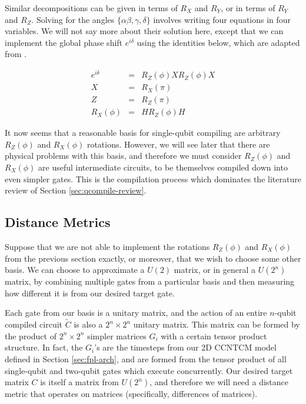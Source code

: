 Similar decompositions can be given in terms of $R_X$ and $R_Y$, or in
terms of $R_Y$ and $R_Z$. Solving for the angles $\{ \alpha \beta, \gamma, \delta \}$
involves writing four equations in four variables. We will not say
more about their solution here, except that we can implement the
global phase shift $e^{i\delta}$ using the identities below, which are
adapted from \cite{Kitaev2002}.

\begin{eqnarray}
e^{i\delta} & = & R_Z(\phi)X R_Z(\phi) X \\
X & = & R_X(\pi) \\
Z & = & R_Z(\pi) \\
R_X(\phi) & = & H R_Z(\phi) H
\end{eqnarray}

It now seems that a reasonable basis for single-qubit compiling are
arbitrary $R_Z(\phi)$ and $R_X(\phi)$ rotations. However, we will see later
that there are physical problems with this basis, and therefore we must
consider $R_Z(\phi)$ and $R_X(\phi)$ are useful intermediate circuits,
to be themselves compiled down into even simpler gates. This is the
compilation process which dominates the literature review of 
Section \ref{sec:qcompile-review}.

\subsection{Distance Metrics}
\label{subsec:distance}

Suppose that we are not able to implement the rotations $R_Z(\phi)$
and $R_X(\phi)$ from the previous section exactly, or moreover, that we
wish to choose some other basis. We can choose to approximate a
$U(2)$ matrix, or in general a $U(2^n)$ matrix, by combining multiple
gates from a particular basis and then measuring how different it is
from our desired target gate.

Each gate from our basis is a unitary matrix, and the action of an entire
$n$-qubit compiled circuit $\tilde{C}$
is also a $2^n \times 2^n$ unitary matrix. This matrix can be formed
by the product of $2^n \times 2^n$ simpler matrices $G_i$ with a certain
tensor product structure. In fact, the $G_i$'s are the timesteps from
our \textsf{2D CCNTCM} model defined in Section \ref{sec:fpl-arch}, and
are formed from the tensor product of all single-qubit and two-qubit gates
which execute concurrently. Our desired target matrix $C$
is itself
a matrix from $U(2^n)$, and therefore we will need a distance metric
that operates on matrices (specifically, differences of matrices).

